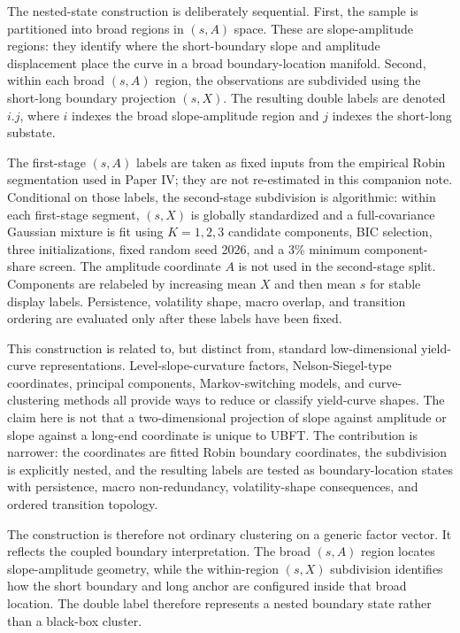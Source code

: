 \documentclass[11pt]{article}
\begin{document}
The nested-state construction is deliberately sequential. First, the sample is partitioned into broad regions in $(s,A)$ space. These are slope-amplitude regions: they identify where the short-boundary slope and amplitude displacement place the curve in a broad boundary-location manifold. Second, within each broad $(s,A)$ region, the observations are subdivided using the short-long boundary projection $(s,X)$. The resulting double labels are denoted $i.j$, where $i$ indexes the broad slope-amplitude region and $j$ indexes the short-long substate.

The first-stage $(s,A)$ labels are taken as fixed inputs from the empirical Robin segmentation used in Paper IV; they are not re-estimated in this companion note. Conditional on those labels, the second-stage subdivision is algorithmic: within each first-stage segment, $(s,X)$ is globally standardized and a full-covariance Gaussian mixture is fit using $K=1,2,3$ candidate components, BIC selection, three initializations, fixed random seed 2026, and a 3\% minimum component-share screen. The amplitude coordinate $A$ is not used in the second-stage split. Components are relabeled by increasing mean $X$ and then mean $s$ for stable display labels. Persistence, volatility shape, macro overlap, and transition ordering are evaluated only after these labels have been fixed.

This construction is related to, but distinct from, standard low-dimensional yield-curve representations. Level-slope-curvature factors, Nelson-Siegel-type coordinates, principal components, Markov-switching models, and curve-clustering methods all provide ways to reduce or classify yield-curve shapes. The claim here is not that a two-dimensional projection of slope against amplitude or slope against a long-end coordinate is unique to UBFT. The contribution is narrower: the coordinates are fitted Robin boundary coordinates, the subdivision is explicitly nested, and the resulting labels are tested as boundary-location states with persistence, macro non-redundancy, volatility-shape consequences, and ordered transition topology.

The construction is therefore not ordinary clustering on a generic factor vector. It reflects the coupled boundary interpretation. The broad $(s,A)$ region locates slope-amplitude geometry, while the within-region $(s,X)$ subdivision identifies how the short boundary and long anchor are configured inside that broad location. The double label therefore represents a nested boundary state rather than a black-box cluster.
\end{document}
